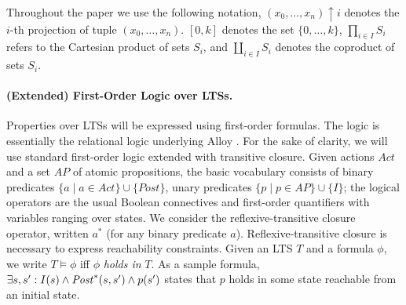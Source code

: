 Throughout the paper we use the following notation, $(x_0,\dots,x_n){\uparrow}i$ denotes the $i$-th projection of tuple $(x_0,\dots,x_n)$. $[0,k]$ denotes the set $\{0,\dots,k\}$, $\prod_{i \in I} S_i$ refers to the Cartesian product of sets $S_i$, and $\coprod_{i \in I} S_i$ denotes the coproduct of sets $S_i$.

\paragraph{(Extended) First-Order Logic over LTSs.} Properties over LTSs will be expressed using first-order formulas. The logic is essentially the relational logic underlying Alloy \cite{AlloyBook}. For the sake of clarity, we will use standard first-order logic extended with transitive closure. Given actions $\textit{Act}$ and a set $\mathit{AP}$ of atomic propositions, the basic vocabulary consists of binary predicates $\{a \mid a \in \mathit{Act}\}\cup\{\mathit{Post}\}$, unary predicates $\{p \mid p \in \mathit{AP}\} \cup \{I\}$; the logical operators are the usual Boolean connectives and first-order quantifiers with variables ranging over states. We consider the reflexive-transitive closure operator, written $a^*$ (for any binary predicate $a$). Reflexive-transitive closure is necessary to express reachability constraints. Given an LTS $T$ and a formula $\phi$, we write $T \vDash \phi$ iff $\phi$ \emph{holds in} $T$. As a sample formula, $\exists s,s': I(s) \wedge \mathit{Post}^*(s,s') \wedge p(s')$ states that $p$ holds in some state reachable from an initial state.


